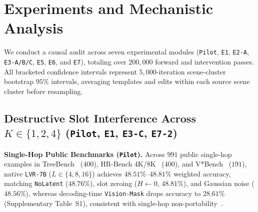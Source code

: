 \section{Experiments and Mechanistic Analysis}
\label{sec:experiments}

We conduct a causal audit across seven experimental modules (\texttt{Pilot}, \texttt{E1}, \texttt{E2-A}, \texttt{E3-A/B/C}, \texttt{E5}, \texttt{E6}, and \texttt{E7}), totaling over $200,000$ forward and intervention passes. All bracketed confidence intervals represent $5,000$-iteration scene-cluster bootstrap $95\%$ intervals, averaging templates and edits within each source scene cluster before resampling.

\subsection{Destructive Slot Interference Across $K \in \{1, 2, 4\}$ (\texttt{Pilot}, \texttt{E1}, \texttt{E3-C}, \texttt{E7-2})}
\label{subsec:exp_e3c}

\textbf{Single-Hop Public Benchmarks (\texttt{Pilot}).} Across $991$ public single-hop examples in TreeBench~\cite{treebench2025} ($400$), HR-Bench 4K/8K~\cite{wang2024hrbench} ($400$), and V*Bench~\cite{wu2024vstar} ($191$), native \texttt{LVR-7B} ($L \in \{4, 8, 16\}$) achieves $48.51\%$--$48.81\%$ weighted accuracy, matching \texttt{NoLatent} ($48.76\%$), slot zeroing ($H \leftarrow 0$, $48.81\%$), and Gaussian noise ($48.56\%$), whereas decoding-time \texttt{Vision-Mask} drops accuracy to $28.61\%$ (Supplementary Table~S1), consistent with single-hop non-portability~\cite{guo2026beyond}.

